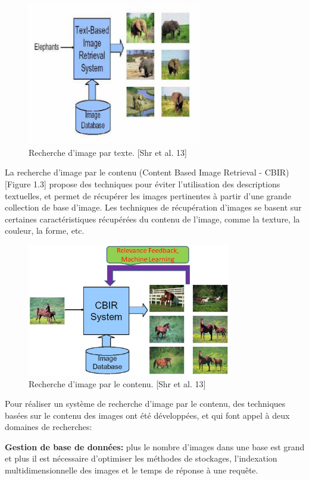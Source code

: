 \begin{figure}[H]
	\centering
		\includegraphics[width=3in]{Figures/textBasedIR.png}
	\caption[An Electron]{Recherche d'image par texte. [Shr et al. 13]}
	\label{fig:Electron}
\end{figure}
	
	La recherche d'image par le contenu (Content Based Image Retrieval - CBIR) [Figure 1.3] propose des techniques pour éviter l'utilisation des descriptions textuelles, et permet de récupérer les images pertinentes à partir d'une grande collection de base d'image. Les techniques de récupération d'images se basent sur certaines caractéristiques récupérées du contenu de l'image, comme la texture, la couleur, la forme, etc.

\begin{figure}[H]
	\centering
		\includegraphics[width=3.5in]{Figures/cbir.JPG}
	\caption[An Electron]{Recherche d'image par le contenu. [Shr et al. 13]}
	\label{fig:Electron}
\end{figure}


	Pour réaliser un système de recherche d'image par le contenu, des techniques basées sur le contenu des images ont été développées, et qui font appel à deux domaines de recherches:

\textbf{Gestion de base de données:} plus le nombre d'images dans une base est grand et plus il est nécessaire d'optimiser les méthodes de stockages, l'indexation multidimensionnelle des images et le temps de réponse à une requête.

